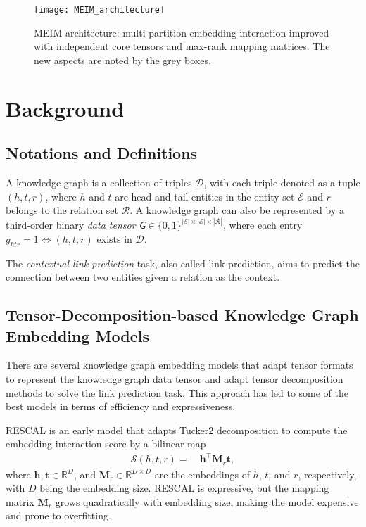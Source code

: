 \documentclass{article}
\def\vh{{\bm{h}}}
\def\vt{{\bm{t}}}
\def\mM{{\bm{M}}}
\newcommand{\tens}[1]{\bm{\mathsfit{#1}}}
\def\tG{{\tens{G}}}
\def\gD{{\mathcal{D}}}
\def\gE{{\mathcal{E}}}
\def\gR{{\mathcal{R}}}
\def\gS{{\mathcal{S}}}
\def\sR{{\mathbb{R}}}
\theoremstyle{plain}
\theoremstyle{remark}
\begin{document}
\begin{figure*}[ht]
	\centering
	\texttt{[image: MEIM\_architecture]}
	\caption{MEIM architecture: multi-partition embedding interaction improved with independent core tensors and max-rank mapping matrices. The new aspects are noted by the grey boxes.}
	\label{fig:meim_architecture}
\end{figure*}


\section{Background} \label{sect:background_mei}


\subsection{Notations and Definitions} \label{sect:notation} 

A knowledge graph is a collection of triples $ \gD $, with each triple denoted as a tuple $ (h, t, r) $, where $ h $ and $ t $ are head and tail entities in the entity set $ \gE $ and $ r $ belongs to the relation set $ \gR $. A knowledge graph can also be represented by a third-order binary \textit{data tensor} $ \tG \in \{0, 1\}^{|\gE| \times |\gE| \times |\gR|} $, where each entry $ g_{htr} = 1 \Leftrightarrow (h, t, r) \text{ exists in } \gD $. 

The \textit{contextual link prediction} task, also called link prediction, aims to predict the connection between two entities given a relation as the context. 

\subsection{Tensor-Decomposition-based Knowledge Graph Embedding Models}
There are several knowledge graph embedding models that adapt tensor formats to represent the knowledge graph data tensor and adapt tensor decomposition methods to solve the link prediction task. This approach has led to some of the best models in terms of efficiency and expressiveness.

RESCAL \cite{nickel_threewaymodelcollective_2011} is an early model that adapts Tucker2 decomposition to compute the embedding interaction score by a bilinear map 
\begin{align} \label{eq:rescal}
\gS(h,t,r) =\ &\vh^\top \mM_r \vt,
\end{align}
where $ \vh, \vt \in \sR^D $, and $ \mM_r \in \sR^{D \times D} $ are the embeddings of $ h $, $ t $, and $ r $, respectively, with $ D $ being the embedding size. RESCAL is expressive, but the mapping matrix $ \mM_r $ grows quadratically with embedding size, making the model expensive and prone to overfitting. 
\end{document}
